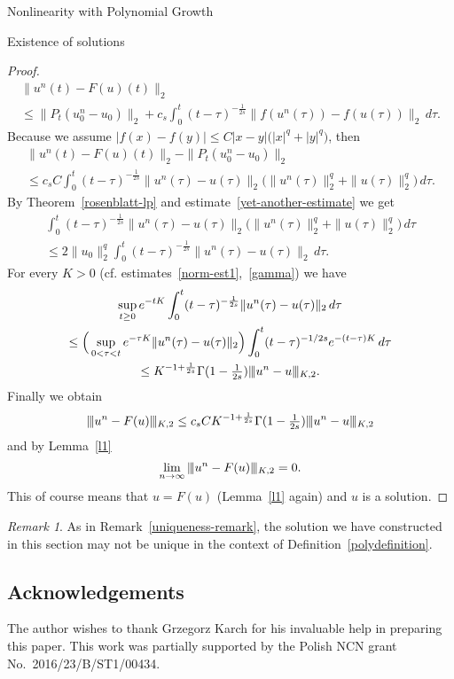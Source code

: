 \documentclass[a4paper,10pt,fleqn]{amsart}
\theoremstyle{remark}
\newtheorem{remark}[theorem]{Remark}
\theoremstyle{definition}
\renewcommand{\=} {\overset{d}{=}}
\newcommand{\viii} {|\kern-0.25ex|\kern-0.25ex|}
\newcommand{\K}[2] {\viii #1 \viii_{K,#2}}
\begin{document}
\begin{section}{Nonlinearity with Polynomial Growth}
\begin{subsection}{Existence of solutions}
\begin{proof}
          \begin{multline*}
              \|u^n(t)-F(u)(t)\|_2 \\\leq \|P_{t}(u^n_0-u_0)\|_2 + c_s\int_0^{t} (t-\tau)^{-\frac{1}{2s}} \|f(u^n(\tau))-f(u(\tau))\|_2\,d\tau.
	  \end{multline*}
	  Because we assume $|f(x)-f(y)|\leq C|x-y|\big(|x|^q+|y|^q\big)$, then
          \begin{multline*}
              \|u^n(t)-F(u)(t)\|_2  - \|P_{t}(u^n_0-u_0)\|_2 \\\leq
              c_sC\int_0^{t} (t-\tau)^{-\frac{1}{2s}} \|u^n(\tau)-u(\tau)\|_2\big(\|u^n(\tau)\|_2^q+\|u(\tau)\|_2^q\big)\,d\tau.
          \end{multline*}
         By Theorem~\ref{rosenblatt-lp} and estimate~\eqref{yet-another-estimate} we get
         \begin{multline*}
          \int_0^{t} (t-\tau)^{-\frac{1}{2s}} \|u^n(\tau)-u(\tau)\|_2\big(\|u^n(\tau)\|^q_2+\|u(\tau)\|^q_2\big)\,d\tau\\
          \leq 2\|u_0\|_2^q\int_0^{t} (t-\tau)^{-\frac{1}{2s}} \|u^n(\tau)-u(\tau)\|_2\,d\tau.
         \end{multline*}
         For every $K>0$ (cf. estimates~\eqref{norm-est1},~\eqref{gamma}) we have
         \begin{multline*}
          \sup_{t\geq0} e^{-tK}\int_0^{t} (t-\tau)^{-\frac{1}{2s}} \|u^n(\tau)-u(\tau)\|_2\,d\tau\\\leq
          \Big(\sup_{0<\tau<t}e^{-\tau K}\|u^n(\tau)-u(\tau)\|_2\Big) \int_0^{t} (t-\tau)^{-1/2s} e^{-(t-\tau) K}\,d\tau
          \\\leq  K^{-1+\frac{1}{2s}}\Gamma(1-\tfrac{1}{2s})\K{u^n-u}{2}.
         \end{multline*}
         Finally we obtain
         \begin{equation*}
         \K{u^n-F(u)}{2}\leq c_sCK^{-1+\frac{1}{2s}}\Gamma(1-\tfrac{1}{2s})\K{u^n-u}{2}
         \end{equation*}
         and by Lemma~\ref{l1}
         \begin{equation*}
         \lim_{n\to\infty}\K{u^n-F(u)}{2}=0.
         \end{equation*}
         This of course means that $u=F(u)$ (Lemma~\ref{l1} again) and $u$ is a solution.
      \end{proof}
      \begin{remark}
       As in Remark~\ref{uniqueness-remark}, the solution we have constructed in this section
       may not be unique in the context of Definition~\ref{polydefinition}.
      \end{remark}
    \end{subsection}
    \section*{Acknowledgements}
    The author wishes to thank Grzegorz Karch for his invaluable help in preparing this paper.
    This work was partially supported by the Polish NCN grant No.~2016/23/B/ST1/00434.
\end{section}

  
\end{document}
